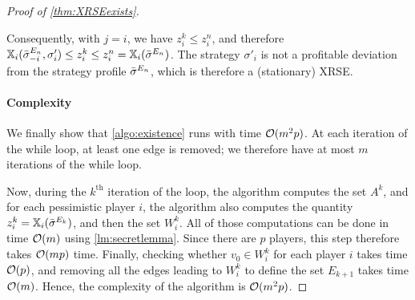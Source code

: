\begin{proof}[Proof of \cref{thm:XRSEexists}]
\begin{claimproof}
    
    Consequently, with $j = i$, we have $z_i^k \leq z_i^n$, and therefore $\mathbb{X}_i({\bar{\sigma}}^{E_n}_{-i}, \sigma'_i) \leq z_i^k \leq z_i^n = \mathbb{X}_i({\bar{\sigma}}^{E_n})$.
    The strategy $\sigma'_i$ is not a profitable deviation from the strategy profile ${\bar{\sigma}}^{E_n}$, which is therefore a (stationary) XRSE.
\end{claimproof}


    
    \paragraph*{Complexity}

    We finally show that \cref{algo:existence} runs with time $\mathcal{O}(m^2p)$.
    At each iteration of the while loop, at least one edge is removed; we therefore have at most $m$ iterations of the while loop.

    Now, during the $k^\text{th}$ iteration of the loop, the algorithm computes the set $A^k$, and for each pessimistic player $i$, the algorithm also computes the quantity $z_i^k = \mathbb{X}_i({\bar{\sigma}}^{E_k})$, and then the set $W^k_i$.
    All of those computations can be done in time $\mathcal{O}(m)$ using \cref{lm:secretlemma}. Since there are $p$ players, this step therefore takes $\mathcal{O}(mp)$ time.
    Finally, checking whether $v_0 \in W^k_i$ for each player $i$ takes time $\mathcal{O}(p)$, and removing all the edges leading to $W_i^k$ to define the set $E_{k+1}$ takes time $\mathcal{O}(m)$.
    Hence, the complexity of the algorithm is $\mathcal{O}(m^2 p)$.
\end{proof}